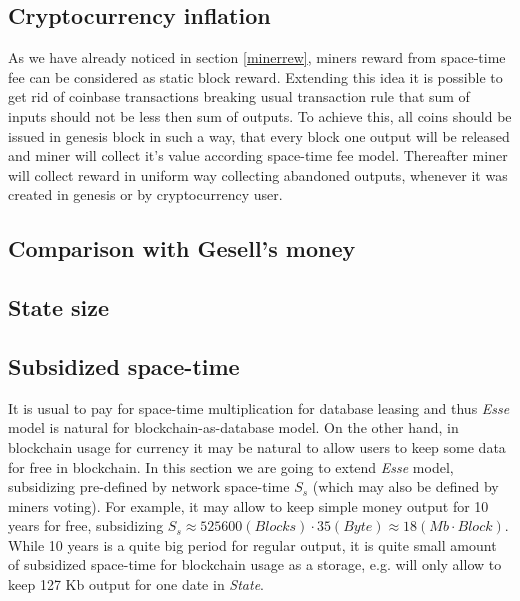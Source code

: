 \documentclass[]{article}   %
\newcommand{\authnote}[2]{\marginpar{\parbox{\marginparwidth}{\tiny %
  \textsf{#1 {\textcolor{blue}{notes: #2}}}}}%
  \textcolor{blue}{\textbf{\dag}}}
\newcommand{\authnote}[2]{
  \textsf{#1 \textcolor{blue}{: #2}}}
\newcommand{\authnote}[2]{}
\newcommand{\dnote}[1]{{\authnote{\textcolor{blue}{Dima notes}}{#1}}}
\newcommand{\esse}{\textit{Esse}}
\newcommand{\state}{\textit{State}}
\begin{document}
\dnote{What is an output value when miner is interested in collecting it?}

\subsection{Cryptocurrency inflation}

As we have already noticed in section \ref{minerrew}, miners reward from space-time fee can be considered as static block reward. Extending this idea it is possible to get rid of coinbase transactions breaking usual transaction rule that sum of inputs should not be less then sum of outputs. To achieve this, all coins should be issued in genesis block in such a way, that every block one output will be released and miner will collect it's value according space-time fee model. Thereafter miner will collect reward in uniform way collecting abandoned outputs, whenever it was created in genesis or by cryptocurrency user.

\subsection{Comparison with Gesell's money}

\dnote{Comparison with Gesell's money~(money with demurrage)}

\subsection{State size}
\dnote{Max and expected state size}


\subsection{Subsidized space-time}

It is usual to pay for space-time multiplication for database leasing and thus \esse{} model is natural for blockchain-as-database model. On the other hand, in blockchain usage for currency it may be natural to allow users to keep some data for free in blockchain. In this section we are going to extend \esse{} model, subsidizing pre-defined by network space-time $S_s$ (which may also be defined by miners voting). For example, it may allow to keep simple money output for 10 years for free, subsidizing $S_s \approx 525600 (Blocks) \cdot 35 (Byte) \approx 18 (Mb \cdot Block)$. While 10 years is a quite big period for regular output, it is quite small amount of subsidized space-time for blockchain usage as a storage, e.g. will only allow to keep 127 Kb output for one date in \state{}.
\end{document}
